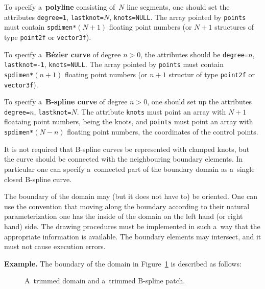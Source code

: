 To specify a~\textbf{polyline} consisting of~$N$ line segments,
one should set the attributes
\texttt{degree=1}, \texttt{lastknot=$N$}, \texttt{knots=NULL}. The array
pointed by \texttt{points} must contain \texttt{spdimen*$(N+1)$}
floating point numbers (or $N+1$ structures of type \texttt{point2f} or
\texttt{vector3f}).

To specify a~\textbf{B\'{e}zier curve} of degree $n>0$, the attributes
should be \texttt{degree=$n$}, \texttt{lastknot=-1}, \texttt{knots=NULL}.
The array pointed by \texttt{points} must contain \\
\texttt{spdimen*$(n+1)$}
floating point numbers (or $n+1$ structur of type \texttt{point2f} or
\texttt{vector3f}).

To specify a~\textbf{B-spline curve} of degree $n>0$, one should set up the
attributes \texttt{degree=$n$}, \texttt{lastknot=$N$}. The attribute
\texttt{knots} must point an array with $N+1$ floataing point numbers,
being the knots, and \texttt{points} must point an array with
\texttt{spdimen*$(N-n)$} floating point numbers, the coordinates
of the control points.

It is not required that B-spline curves be represented with clamped knots,
but the curve should be connected with the neighbouring boundary elements.
In particular one can specify a~connected part of the boundary domain
as a~single closed B-spline curve.

\vspace{\medskipamount}
The boundary of the domain may (but it does not have to) be oriented.
One can use the convention that moving along the boundary according to their
natural parameterization one has the inside of the domain on the
left hand (or right hand) side. The drawing procedures must be implemented
in such a~way that the appropriate information is available.
The boundary elements may intersect, and it must not cause execution
errors.

\vspace{\medskipamount}\noindent
\textbf{Example.} The boundary of the domain in Figure~\ref{fig:trimpatch}
is described as follows:%
\begin{figure}[ht]
  \centerline{}
  \caption{\label{fig:trimpatch}A~trimmed domain and a~trimmed B-spline patch.}
\end{figure}


